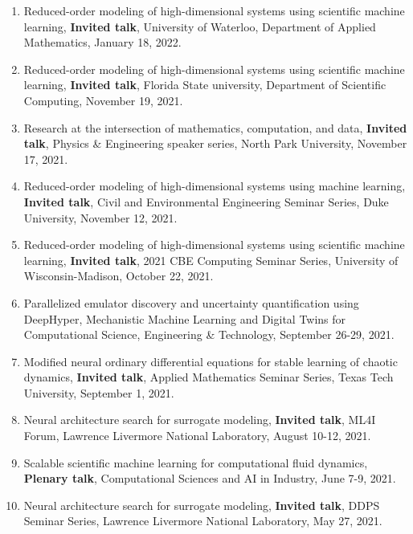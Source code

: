 \documentclass[letterpaper]{article}
\begin{document}
\begin{enumerate}
\item Reduced-order modeling of high-dimensional systems using scientific machine learning, \textbf{Invited talk}, University of Waterloo, Department of Applied Mathematics, January 18, 2022.

\item Reduced-order modeling of high-dimensional systems using scientific machine learning, \textbf{Invited talk}, Florida State university, Department of Scientific Computing, November 19, 2021.

\item Research at the intersection of mathematics, computation, and data, \textbf{Invited talk}, Physics \& Engineering speaker series, North Park University, November 17, 2021.

\item Reduced-order modeling of high-dimensional systems using machine learning, \textbf{Invited talk}, Civil and Environmental Engineering Seminar Series, Duke University, November 12, 2021.

\item Reduced-order modeling of high-dimensional systems using scientific machine learning, \textbf{Invited talk}, 2021 CBE Computing Seminar Series, University of Wisconsin-Madison, October 22, 2021.

\item Parallelized emulator discovery and uncertainty quantification using DeepHyper, Mechanistic Machine Learning and Digital Twins for Computational Science, Engineering \& Technology, September 26-29, 2021.

\item Modified neural ordinary differential equations for stable learning of chaotic dynamics, \textbf{Invited talk}, Applied Mathematics Seminar Series, Texas Tech University, September 1, 2021.

\item Neural architecture search for surrogate modeling, \textbf{Invited talk}, ML4I Forum, Lawrence Livermore National Laboratory, August 10-12, 2021.

\item Scalable scientific machine learning for computational fluid dynamics, \textbf{Plenary talk}, Computational Sciences and AI in Industry, June 7-9, 2021.

\item Neural architecture search for surrogate modeling, \textbf{Invited talk}, DDPS Seminar Series, Lawrence Livermore National Laboratory, May 27, 2021.


\end{enumerate}
\end{document}
